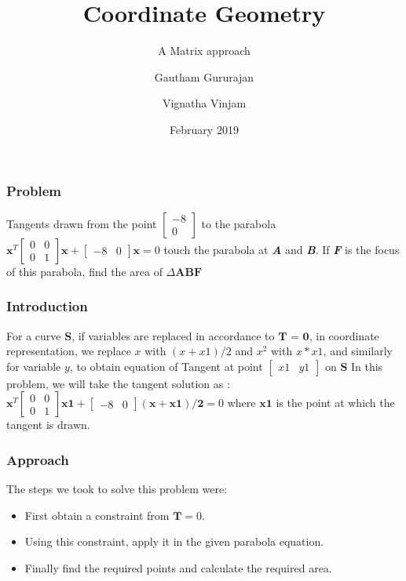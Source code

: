 \documentclass{beamer}
\title{Coordinate Geometry}
\subtitle{A Matrix approach}
\author{Gautham Gururajan \and Vignatha Vinjam}
\institute{Indian Institute of Technology Hyderabad}
\date{February 2019}
\begin{document}
 
\frame{\titlepage}
 
\begin{frame}
\frametitle{Problem}
Tangents drawn from the point $\begin{bmatrix}-8\\0
\end{bmatrix}$ to the parabola \newline
$\mathbf{x}^T \begin{bmatrix} 0 & 0 \\0 & 1
\end{bmatrix} \mathbf{x} + \begin{bmatrix} -8 & 0
\end{bmatrix} \mathbf{x} = 0$ \newline
\newline
touch the parabola at \textbf{\textit{A}} and \textbf{\textit{B}}. \newline
\newline
If \textbf{\textit{F}} is the focus of this parabola, find the area of $\Delta \mathbf{ABF}$ 

\end{frame}
\begin{frame}
\frametitle{Introduction}
For a curve $\textbf{S}$, if variables are replaced in accordance to $\textbf{T = 0}$,
\newline 
in coordinate representation, we replace $x$ with $(x+x1)/2$ and $x^{2}$ with $x*x1$, and similarly for variable $y$, to obtain equation of Tangent at point $\begin{bmatrix} x1 & y1
\end{bmatrix}$ on $\textbf{S}$
\newline
\newline
In this problem, we will take the tangent solution as : 
\newline
\newline
$\mathbf{x}^T \begin{bmatrix} 0 & 0 \\0 & 1
\end{bmatrix} \mathbf{x1} + \begin{bmatrix} -8 & 0
\end{bmatrix} \mathbf{(x + x1)/2} = 0$ \newline
\newline
where $\mathbf{x1}$ is the point at which the tangent is drawn.
\end{frame}

\begin{frame}
\frametitle{Approach }
The steps we took to solve this problem were:
\begin{itemize}
	\item<1-> First obtain a constraint from $\textbf{T} = 0$.
	\item<2-> Using this constraint, apply it in the given parabola equation.
	\item<3-> Finally find the required points and calculate the required area.
\end{itemize}

\end{frame}
\end{document}
